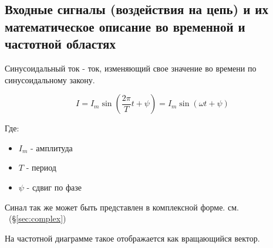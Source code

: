 \subsection{Входные сигналы (воздействия на цепь) и их математическое описание во временной и частотной областях}


Синусоидальный ток - ток, изменяющий свое значение во времени по синусоидальному закону.


\begin{equation}
I = I_m \sin(\frac{2 \pi }{T} t + \psi) = I_m \sin ( \omega t + \psi )
\end{equation}

Где:

\begin{itemize}
\item
$ I_m $  - амплитуда
\item
$ T $ - период
\item
$ \psi $ - сдвиг по фазе
\end{itemize}


Синал так же может быть представлен в комплексной форме. см. ~(\S \ref{sec:complex})

На частотной диаграмме такое отображается как вращающийся вектор.


\pagebreak